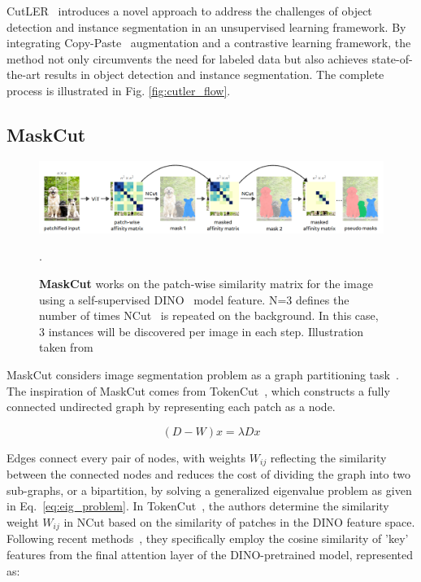 CutLER~\cite{wang2023cut} introduces a novel approach to address the challenges of object detection and instance segmentation in an unsupervised learning framework. By integrating Copy-Paste~\cite{ghiasi2021simplecopypastestrongdata} augmentation and a contrastive learning framework, the method not only circumvents the need for labeled data but also achieves state-of-the-art results in object detection and instance segmentation. The complete process is illustrated in Fig. \ref{fig:cutler_flow}.
 
\subsection{MaskCut}
\begin{figure}
	\centering
	\includegraphics[width=1.0\textwidth]{Images/main/maskcut_eg.png}
	\caption[\textbf{MaskCut flow}]{\textbf{MaskCut} works on the patch-wise
		similarity matrix for the image using a self-supervised DINO~\cite{caron2021emerging} model feature. N=3 defines the number of times NCut~\cite{normcut} is repeated on the background. In this case, 3 instances will be discovered per image in each step. Illustration taken from~\cite{wang2023cut}}.
	\label{fig:maskcut_flow}
\end{figure}
MaskCut considers image segmentation problem as a graph partitioning task~\cite{normcut}. The inspiration of MaskCut comes from TokenCut~\cite{wang2022tokencut}, which constructs a fully connected undirected graph by representing each patch as a node.

\begin{equation}
	\label{eq:eig_problem}
	(D - W)x = \lambda Dx
\end{equation}

Edges connect every pair of nodes, with weights \(W_{ij}\) reflecting the similarity between the connected nodes and reduces the cost of dividing the graph into two sub-graphs, or a bipartition, by solving a generalized eigenvalue problem as given in Eq.~\ref{eq:eig_problem}. In TokenCut~\cite{wang2022tokencut}, the authors determine the similarity weight \( W_{ij} \) in NCut based on the similarity of patches in the DINO feature space. Following recent methods~\cite{simeoni2021localizingobjectsselfsupervisedtransformers, vangansbeke2022discoveringobjectmaskstransformers, wang2023tokencutsegmentingobjectsimages}, they specifically employ the cosine similarity of 'key' features from the final attention layer of the DINO-pretrained model, represented as:

